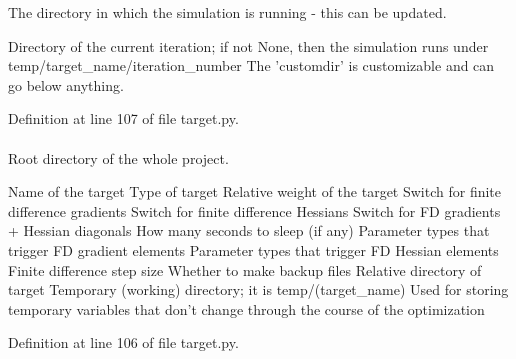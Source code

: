 \-The directory in which the simulation is running -\/ this can be updated. 

\-Directory of the current iteration; if not \-None, then the simulation runs under temp/target\-\_\-name/iteration\-\_\-number \-The 'customdir' is customizable and can go below anything.

\-Definition at line 107 of file target.\-py.

\hypertarget{classforcebalance_1_1target_1_1Target_aede2856573b890cd47054ad36937d6f6}{
\paragraph[{tempdir}]{}}\label{classforcebalance_1_1target_1_1Target_aede2856573b890cd47054ad36937d6f6}


\-Root directory of the whole project. 

\-Name of the target \-Type of target \-Relative weight of the target \-Switch for finite difference gradients \-Switch for finite difference \-Hessians \-Switch for \-F\-D gradients + \-Hessian diagonals \-How many seconds to sleep (if any) \-Parameter types that trigger \-F\-D gradient elements \-Parameter types that trigger \-F\-D \-Hessian elements \-Finite difference step size \-Whether to make backup files \-Relative directory of target \-Temporary (working) directory; it is temp/(target\-\_\-name) \-Used for storing temporary variables that don't change through the course of the optimization 

\-Definition at line 106 of file target.\-py.

\hypertarget{classforcebalance_1_1BaseClass_afd68efa29ccd2f320f4cf82198214aac}{
\paragraph[{verbose\-\_\-options}]{}}\label{classforcebalance_1_1BaseClass_afd68efa29ccd2f320f4cf82198214aac}


